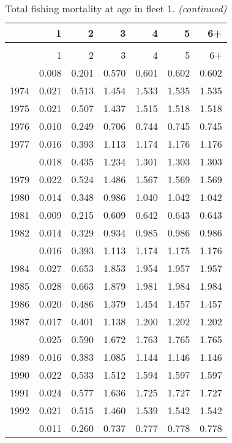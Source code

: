 \documentclass[
]{article}
\begin{document}
\begin{longtable}[t]{lrrrrrr}
\caption{\label{tab:fleet_1-fleet-FAA-table}Total fishing mortality at age in fleet 1.}\\
\toprule
  & 1 & 2 & 3 & 4 & 5 & 6+\\
\midrule
\endfirsthead
\caption[]{Total fishing mortality at age in fleet 1. \textit{(continued)}}\\
\toprule
  & 1 & 2 & 3 & 4 & 5 & 6+\\
\midrule
\endhead

\endfoot
\bottomrule
\endlastfoot
1973 & 0.008 & 0.201 & 0.570 & 0.601 & 0.602 & 0.602\\
1974 & 0.021 & 0.513 & 1.454 & 1.533 & 1.535 & 1.535\\
1975 & 0.021 & 0.507 & 1.437 & 1.515 & 1.518 & 1.518\\
1976 & 0.010 & 0.249 & 0.706 & 0.744 & 0.745 & 0.745\\
1977 & 0.016 & 0.393 & 1.113 & 1.174 & 1.176 & 1.176\\
\addlinespace
1978 & 0.018 & 0.435 & 1.234 & 1.301 & 1.303 & 1.303\\
1979 & 0.022 & 0.524 & 1.486 & 1.567 & 1.569 & 1.569\\
1980 & 0.014 & 0.348 & 0.986 & 1.040 & 1.042 & 1.042\\
1981 & 0.009 & 0.215 & 0.609 & 0.642 & 0.643 & 0.643\\
1982 & 0.014 & 0.329 & 0.934 & 0.985 & 0.986 & 0.986\\
\addlinespace
1983 & 0.016 & 0.393 & 1.113 & 1.174 & 1.175 & 1.176\\
1984 & 0.027 & 0.653 & 1.853 & 1.954 & 1.957 & 1.957\\
1985 & 0.028 & 0.663 & 1.879 & 1.981 & 1.984 & 1.984\\
1986 & 0.020 & 0.486 & 1.379 & 1.454 & 1.457 & 1.457\\
1987 & 0.017 & 0.401 & 1.138 & 1.200 & 1.202 & 1.202\\
\addlinespace
1988 & 0.025 & 0.590 & 1.672 & 1.763 & 1.765 & 1.765\\
1989 & 0.016 & 0.383 & 1.085 & 1.144 & 1.146 & 1.146\\
1990 & 0.022 & 0.533 & 1.512 & 1.594 & 1.597 & 1.597\\
1991 & 0.024 & 0.577 & 1.636 & 1.725 & 1.727 & 1.727\\
1992 & 0.021 & 0.515 & 1.460 & 1.539 & 1.542 & 1.542\\
\addlinespace
1993 & 0.011 & 0.260 & 0.737 & 0.777 & 0.778 & 0.778\\

\end{longtable}
\end{document}
